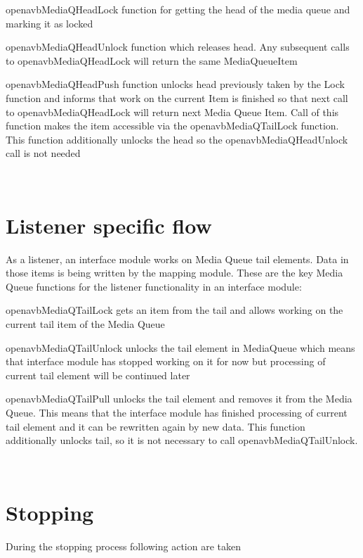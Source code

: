 \begin{DoxyItemize}
\item openavb\+Media\+Q\+Head\+Lock function for getting the head of the media queue and marking it as locked
\item openavb\+Media\+Q\+Head\+Unlock function which releases head. Any subsequent calls to openavb\+Media\+Q\+Head\+Lock will return the same Media\+Queue\+Item
\item openavb\+Media\+Q\+Head\+Push function unlocks head previously taken by the Lock function and informs that work on the current Item is finished so that next call to openavb\+Media\+Q\+Head\+Lock will return next Media Queue Item. Call of this function makes the item accessible via the openavb\+Media\+Q\+Tail\+Lock function. This function additionally unlocks the head so the openavb\+Media\+Q\+Head\+Unlock call is not needed
\end{DoxyItemize}

~\newline
\hypertarget{sdk_notes_media_queue_usage_media_queue_usage_listener}{}\section{Listener specific flow    }\label{sdk_notes_media_queue_usage_media_queue_usage_listener}
As a listener, an interface module works on Media Queue tail elements. Data in those items is being written by the mapping module. These are the key Media Queue functions for the listener functionality in an interface module\+:


\begin{DoxyItemize}
\item openavb\+Media\+Q\+Tail\+Lock gets an item from the tail and allows working on the current tail item of the Media Queue
\item openavb\+Media\+Q\+Tail\+Unlock unlocks the tail element in Media\+Queue which means that interface module has stopped working on it for now but processing of current tail element will be continued later
\item openavb\+Media\+Q\+Tail\+Pull unlocks the tail element and removes it from the Media Queue. This means that the interface module has finished processing of current tail element and it can be rewritten again by new data. This function additionally unlocks tail, so it is not necessary to call openavb\+Media\+Q\+Tail\+Unlock.
\end{DoxyItemize}

~\newline
\hypertarget{sdk_notes_media_queue_usage_media_queue_usage_stop}{}\section{Stopping     }\label{sdk_notes_media_queue_usage_media_queue_usage_stop}
During the stopping process following action are taken


